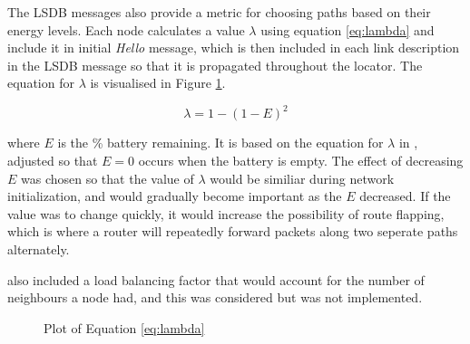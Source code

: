 \documentclass[12pt]{article}
\begin{document}
The LSDB messages also provide a metric for choosing paths based on their energy levels. Each node calculates a value $\lambda$ using equation \ref{eq:lambda} and include it in initial \emph{Hello} message, which is then included in each link description in the LSDB message so that it is propagated throughout the locator. The equation for $\lambda$ is visualised in Figure \ref{fig:lambda}. 

\begin{equation} \label{eq:lambda}
	\lambda = 1 -(1 - E)^2
\end{equation}

where $E$ is the \% battery remaining. It is based on the equation for $\lambda$ in \cite{groups}, adjusted so that $E = 0$ occurs when the battery is empty. 
The effect of decreasing $E$ was chosen so that the value of $\lambda$ would be similiar during network initialization, and would gradually become important as the $E$ decreased. If the value was to change quickly, it would increase the possibility of route flapping, which is where a router will repeatedly forward packets along two seperate paths alternately.

\cite{groups} also included a load balancing factor that would account for the number of neighbours a node had, and this was considered but was not implemented.

\begin{figure}[h]
	\centering
	   \caption{Plot of Equation \ref{eq:lambda}}
	\label{fig:lambda}
\end{figure}
\end{document}
